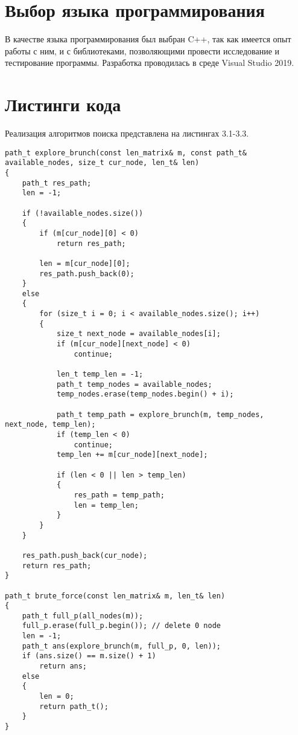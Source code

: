 \section{Выбор языка программирования}
В качестве языка программирования был выбран C++\cite{C++_Doc}, так как имеется опыт работы с ним, и с библиотеками, позволяющими провести исследование и тестирование программы. Разработка проводилась в среде Visual Studio 2019\cite{VisualStudio}.

\section{Листинги кода}
Реализация алгоритмов поиска представлена на листингах 3.1-3.3.

\begin{lstlisting}[caption = {Поиск полным перебором}]
path_t explore_brunch(const len_matrix& m, const path_t& available_nodes, size_t cur_node, len_t& len)
{
	path_t res_path;
	len = -1;
	
	if (!available_nodes.size())
	{
		if (m[cur_node][0] < 0)
			return res_path;
		
		len = m[cur_node][0];
		res_path.push_back(0);
	}
	else
	{
		for (size_t i = 0; i < available_nodes.size(); i++)
		{
			size_t next_node = available_nodes[i];
			if (m[cur_node][next_node] < 0)
				continue;
			
			len_t temp_len = -1;
			path_t temp_nodes = available_nodes;
			temp_nodes.erase(temp_nodes.begin() + i);
			
			path_t temp_path = explore_brunch(m, temp_nodes, next_node, temp_len);
			if (temp_len < 0)
				continue;
			temp_len += m[cur_node][next_node];
			
			if (len < 0 || len > temp_len)
			{
				res_path = temp_path;
				len = temp_len;
			}
		}
	}
	
	res_path.push_back(cur_node);
	return res_path;
}

path_t brute_force(const len_matrix& m, len_t& len)
{
	path_t full_p(all_nodes(m));
	full_p.erase(full_p.begin()); // delete 0 node
	len = -1;
	path_t ans(explore_brunch(m, full_p, 0, len));
	if (ans.size() == m.size() + 1)
		return ans;
	else
	{
		len = 0;
		return path_t();
	}
}
\end{lstlisting}

